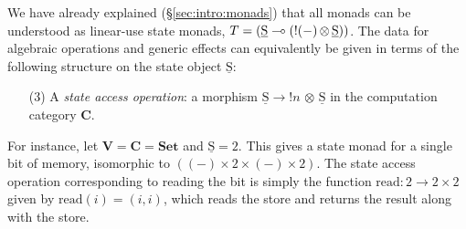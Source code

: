 \documentclass{LMCS}
\newcommand{\hide}[1]{}
\newcommand{\tensor}{\otimes}
\newcommand{\ltensortype}[2]{{!} #1 \, {\tensor} \, #2}
\newcommand{\VCat}{\fixedcatfont{V}} \newcommand{\CCat}{\fixedcatfont{C}} \newcommand{\DCat}{\fixedcatfont{D}}
\newcommand{\fixedcatfont}{\mathbf}
\newcommand{\Set}{\mathbf{Set}}
\newcommand{\states}{{\underline{\mathrm{S}}}}
\begin{document}
We have already explained (\S\ref{sec:intro:monads})
that all monads can be understood as linear-use state monads,
$T=(\states\lpop(\ltensortype{(-)}\states))$.
The data for algebraic operations and generic effects
can equivalently be given in terms of the following structure on 
the state object $\states$:
\begin{enumerate}
\item[(3)]
A \emph{state access operation}: 
a morphism $\states\to \ltensortype n \states$
in the computation category $\CCat$.
\end{enumerate}
For instance, let $\VCat=\CCat=\Set$ and $\states=2$.
This gives a state monad for a single bit of memory,
isomorphic to $((-)\times 2\times (-)\times 2)$.
The state access operation corresponding to 
reading the bit is simply the function 
$\mathrm{read}:2\to 2\times 2$ 
given by $\mathrm{read}(i)=(i,i)$, 
which reads 
the store and returns the result along with the store.
\hide{
For another example,
consider the monad $2^*\times (-)$ for printing bits.
We let $\VCat=\Set$. We let $\CCat$ be the category
of whose objects are sets $X$ equipped with 
a function $\mathrm{p}_X:2\times X\to X$;
morphisms in $\CCat$ are functions that preserve the structure.
The idea is that $X$ is a set of computations
and $\mathrm{p}_X(i,x)$ is a computation that first prints~$i$ 
and then continues as $x$.
The set of bit-strings $2^*$ is an object of $\CCat$,
with ${p_{2^*}(i,s)=is}$. 
The resulting linear-use state monad is the monad for printing bits.

We can investigate this theory in terms of algebraic operations,
generic effects and state access operations.
\begin{itemize}
\item A $T$-algebra is the same thing as an object of $\CCat$,
and so the algebraic operations are the unary
functions $\mathrm{p}_X(0,-):X\to X$, $\mathrm{p}_X(1,-):X\to X$.
\item The generic effects are 
functions 
$\mathtt{print\,0}:1\to T(1)$,
$\mathtt{print\,1}:1\to T(1)$
which describe commands that print 0 and 1 respectively.
\item The state access operations are
homomorphisms $\mathrm{print\,}i: 2^*\to 2^*$,
which take a bit string -- the history of what has been 
printed so far -- and append 0 or 1.
\end{itemize}
}
\end{document}
